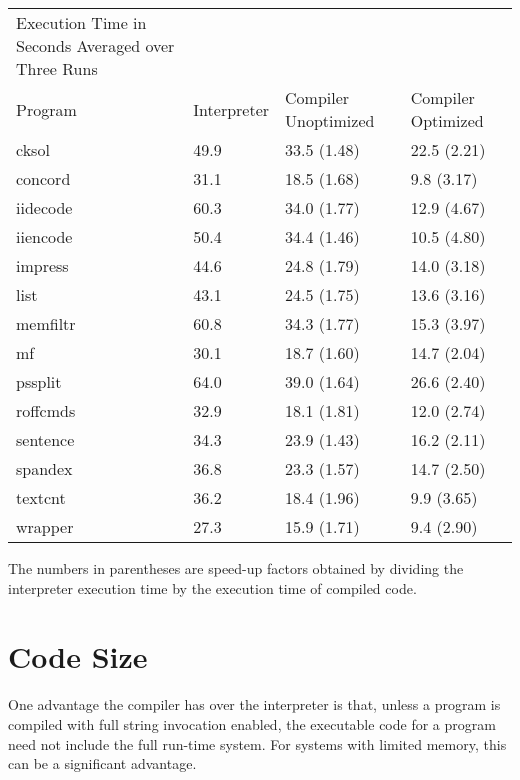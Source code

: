 \begin{center}
\tablefirsthead{}
\tablehead{}
\tabletail{}
\tablelasttail{}
\begin{supertabular}{m{3.3525598in}m{0.6143598in}m{0.7684598in}m{0.6434598in}}
 Execution Time in Seconds Averaged over Three Runs &
~
 &
~
 &
~
\\
 Program &
 Interpreter &
 Compiler \newline
Unoptimized &
 Compiler \newline
Optimized\\
 cksol  &
 49.9  &
 33.5 (1.48)  &
 22.5 (2.21) \\
 concord  &
 31.1  &
 18.5 (1.68)  &
 9.8 (3.17) \\
 iidecode  &
 60.3  &
 34.0 (1.77)  &
 12.9 (4.67) \\
 iiencode  &
 50.4  &
 34.4 (1.46)  &
 10.5 (4.80) \\
 impress  &
 44.6  &
 24.8 (1.79)  &
 14.0 (3.18) \\
 list  &
 43.1  &
 24.5 (1.75)  &
 13.6 (3.16) \\
 memfiltr  &
 60.8  &
 34.3 (1.77)  &
 15.3 (3.97) \\
 mf  &
 30.1  &
 18.7 (1.60)  &
 14.7 (2.04) \\
 pssplit  &
 64.0  &
 39.0 (1.64)  &
 26.6 (2.40) \\
 roffcmds  &
 32.9  &
 18.1 (1.81)  &
 12.0 (2.74) \\
 sentence  &
 34.3  &
 23.9 (1.43)  &
 16.2 (2.11) \\
 spandex  &
 36.8  &
 23.3 (1.57)  &
 14.7 (2.50) \\
 textcnt  &
 36.2  &
 18.4 (1.96)  &
 9.9 (3.65) \\
 wrapper  &
 27.3  &
 15.9 (1.71)  &
 9.4 (2.90) \\
\end{supertabular}
\end{center}

The numbers in parentheses are speed-up factors obtained by dividing
the interpreter execution time by the execution time of compiled code.


\section{Code Size}

One advantage the compiler has over the interpreter is that, unless a
program is compiled with full string invocation enabled, the
executable code for a program need not include the full run-time
system. For systems with limited memory, this can be a significant
advantage.

